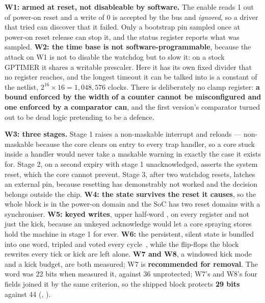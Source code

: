 \textbf{W1: armed at reset, not disableable by software.} The enable
reads 1 out of power-on reset and a write of 0 is accepted by the bus and
\emph{ignored}, so a driver that tried can discover that it failed. Only
a bootstrap pin sampled once at power-on reset release can stop it, and
the status register reports what was sampled. \textbf{W2: the time base is not software-programmable}, because the
attack on W1 is not to disable the watchdog but to slow it: on a stock
GPTIMER it shares a writable prescaler. Here it has its own fixed divider that no
register reaches, and the longest timeout it can be talked into is a
constant of the netlist, $2^{16}\times16 = 1{,}048{,}576$ clocks. There
is deliberately no clamp register: \textbf{a bound enforced by the width
of a counter cannot be misconfigured and one enforced by a comparator
can}, and the first version's comparator turned out to be dead logic
pretending to be a defence.

\textbf{W3: three stages.} Stage 1 raises a non-maskable interrupt and
reloads --- non-maskable because the core clears  on
entry to every trap handler, so a core stuck inside a handler would never
take a maskable warning in exactly the case it exists for. Stage 2, on a second expiry with stage 1 unacknowledged, asserts the
system reset, which the core cannot prevent. Stage 3, after two watchdog
resets, latches an external pin, because resetting has demonstrably not
worked and the decision belongs outside the chip. \textbf{W4: the state
survives the reset it causes}, so the whole block is in the power-on
domain and the SoC has two reset domains with a synchroniser. \textbf{W5:
keyed writes}, upper half-word , on every register and not
just the kick, because an unkeyed acknowledge would let a core spraying
stores hold the machine in stage 1 for ever. \textbf{W6:} the
persistent, silent state is bundled into one word, tripled and voted
every cycle~\cite{johnson2010}, while the flip-flops the block rewrites
every tick or kick are left alone. \textbf{W7 and W8}, a windowed kick mode and a kick
budget, are both measured; W7 is \textbf{recommended for removal}. The
word was 22 bits when  measured it, against 36 unprotected;
W7's and W8's four fields joined it by the same criterion, so the shipped
block protects \textbf{29 bits} against 44
(, ).

